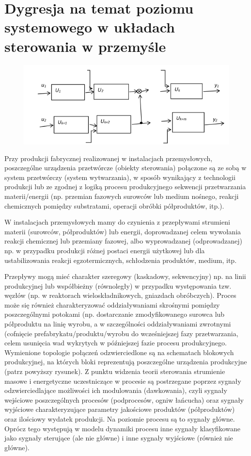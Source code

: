 \documentclass{article}
\begin{document}
	\section{Dygresja na temat poziomu systemowego w układach sterowania w przemyśle}
		\begin{figure}
			\includegraphics[height=0.3\textwidth]{PoziomSystemowy.png}
		\end{figure}
		Przy produkcji fabrycznej realizowanej w instalacjach przemysłowych, poszczególne
		urządzenia przetwórcze (obiekty sterowania) połączone są ze sobą
		w system
		przetwórczy (system wytwarzania), w sposób wynikający z technologii produkcji lub
		ze zgodnej z logiką procesu produkcyjnego sekwencji przetwarzania materii/energii
		(np. przemian fazowych surowców lub medium nośnego, reakcji chemicznych
		pomiędzy substratami, operacji obróbki półproduktów, itp.).

		W instalacjach przemysłowych mamy do czynienia z przepływami strumieni materii
		(surowców, półproduktów) lub energii, doprowadzanej celem wywołania reakcji
		chemicznej lub przemiany fazowej, albo wyprowadzanej (odprowadzanej) np. w
		przypadku produkcji różnej postaci energii użytkowej lub dla ustabilizowania reakcji
		egzotermicznych, schłodzenia produktów, medium, itp.

		Przepływy mogą mieć charakter szeregowy (kaskadowy, sekwencyjny) np. na linii
		produkcyjnej lub współbieżny (równoległy) w przypadku występowania tzw. węzłów
		(np. w reaktorach wieloskładnikowych, gniazdach obróbczych). Proces może się
		również charakteryzować oddziaływaniami skrośnymi pomiędzy poszczególnymi
		potokami (np. dostarczanie zmodyfikowanego surowca lub półproduktu na linię
		wyrobu, a w szczególności oddziaływaniami zwrotnymi (cofnięcie
		prefabrykatu/produktu/wyrobu do wcześniejszej fazy przetwarzania, celem usunięcia
		wad wykrytych w późniejszej fazie procesu produkcyjnego. Wymienione topologie
		połączeń odzwierciedlone są na schematach blokowych produkcyjnej, na których
		bloki reprezentują poszczególne urządzenia produkcyjne (patrz powyższy rysunek).
		Z punktu widzenia teorii sterowania strumienie masowe i energetyczne uczestniczące
		w procesie są postrzegane poprzez sygnały odzwierciedlające możliwości ich
		modulowania (dawkowania), czyli sygnały wejściowe poszczególnych procesów
		(podprocesów, ogniw łańcucha) oraz sygnały wyjściowe charakteryzujące parametry
		jakościowe produktów (półproduktów) oraz ilościowy wydatek produkcji. Na poziomie
		procesu są to sygnały główne. Oprócz tego występują w modelu dynamiki procesu
		inne sygnały klasyfikowane jako sygnały sterujące (ale nie główne) i inne sygnały
		wyjściowe (również nie główne).
\end{document}
